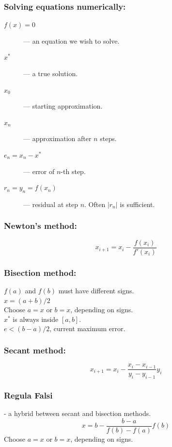 
\subsubsection*{Solving equations numerically:}
\begin{description}
\item[$f(x) = 0$] --- an equation we wish to solve.
\item[$x^*$] --- a true solution.
\item[$x_0$] --- starting approximation.
\item[$x_n$] --- approximation after $n$ steps.
\item[$e_n = x_n - x^*$] --- error of $n$-th step.
\item[$r_n = y_n = f(x_n)$] --- residual at step $n$. 
Often $|r_n|$ is sufficient.
\end{description}


\subsubsection*{Newton's method:}
\begin{equation*}
x_{i+1} = x_i - \frac{f(x_i)}{f'(x_i)}
\end{equation*}


\subsubsection*{Bisection method:}
$f(a)$ and $f(b)$ must have different signs.\\
$x = (a+b)/2$\\
Choose $a = x$ or $b = x$, depending on signs.\\
$x^*$ is always inside $[a,b]$.\\
$e < (b-a)/2$, current maximum error.


\subsubsection*{Secant method:}
\begin{equation*}
x_{i+1} = x_i - \frac{x_i - x_{i-1}}{y_i - y_{i-1}} y_i
\end{equation*}


\subsubsection*{Regula Falsi} - a hybrid between secant and bisection methods.
\begin{equation*}
x = b - \frac{b - a}{f(b) - f(a)} f(b)
\end{equation*}
Choose $a = x$ or $b = x$, depending on signs.

